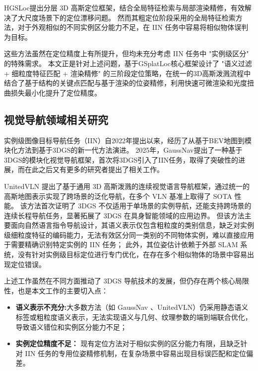 HGSLoc\cite{hgsloc}提出分层 3D 高斯定位框架，结合全局特征检索与局部渲染精修，有效解决了大尺度场景下的定位漂移问题。
然而其粗定位阶段采用的全局特征检索方法，对于外观相似的不同实例区分能力不足，在 IIN 任务中容易将相似物体误判为目标。

这些方法虽然在定位精度上有所提升，但均未充分考虑 IIN 任务中 "实例级区分" 的特殊需求。
本文正是针对上述问题，基于GSplatLoc\cite{gsplatloc}核心框架设计了 "语义过滤 + 细粒度特征匹配 + 渲染精修" 的三阶段定位策略，在统一的3D高斯泼溅流程中结合了基于结构的关键点匹配与基于渲染的位姿精修，利用快速可微渲染和光度扭曲损失最小化提升了定位精度。

\subsection{视觉导航领域相关研究}
实例级图像目标导航任务（IIN）\cite{krantz2022instance}自2022年提出以来，经历了从基于BEV地图到模块化方法到基于3DGS的新一代方法演进。
2025年，GaussNav\cite{gaussnav}提出了一种基于3DGS的模块化视觉导航框架，首次将3DGS\cite{3DGS}引入了IIN任务，取得了突破性的进展，而在此之后又有更多的研究者提出了相关工作。

UnitedVLN\cite{Unitedvln} 提出了基于通用 3D 高斯泼溅的连续视觉语言导航框架，通过统一的高斯地图表示实现了跨场景的泛化导航，在多个 VLN 基准上取得了 SOTA 性能。
该方法首次证明了 3DGS 不仅适用于单场景的实例导航，还能支持跨场景的连续长程导航任务，显著拓展了 3DGS 在具身智能领域的应用边界。
但该方法主要面向自然语言指令导航设计，其语义表示仅包含粗粒度的类别信息，缺乏对实例级细粒度特征的编码能力，无法有效区分同一类别的不同物体实例，难以直接应用于需要精确识别特定实例的 IIN 任务；
此外，其位姿估计依赖于外部 SLAM 系统，没有针对实例级目标定位进行专门优化，在存在多个相似物体的场景中容易出现定位错误。


上述工作虽然在不同方面推动了 3DGS 导航技术的发展，但仍存在两个核心局限性，也是本文工作的主要切入点：
\begin{itemize}
    \item \textbf{语义表示不充分:}大多数方法（如 GaussNav \cite{gaussnav}、UnitedVLN\cite{Unitedvln}）仍采用静态语义标签或粗粒度语义表示，无法实现语义与几何、纹理参数的端到端联合优化，导致语义错位和实例区分能力不足；
    \item \textbf{实例定位精度不足：} 现有定位方法对于相似实例的区分能力有限，且缺乏针对 IIN 任务的专用位姿精修机制，在复杂场景中容易出现目标误匹配和定位偏差。
\end{itemize}

